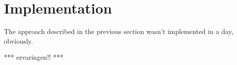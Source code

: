 
\section{Implementation}

The approach described in the previous section wasn't implemented in a day, obviously.

*** ervaringen!! ***